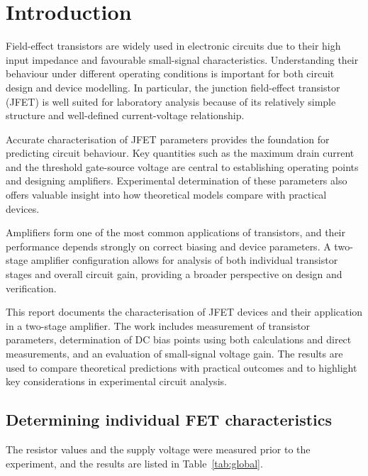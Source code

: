 \documentclass[conference]{IEEEtran}
\begin{document}
\section{Introduction}

Field-effect transistors are widely used in electronic circuits due to their high input impedance and favourable small-signal characteristics.  
Understanding their behaviour under different operating conditions is important for both circuit design and device modelling.  
In particular, the junction field-effect transistor (JFET) is well suited for laboratory analysis because of its relatively simple structure and well-defined current-voltage relationship.  

Accurate characterisation of JFET parameters provides the foundation for predicting circuit behaviour.  
Key quantities such as the maximum drain current and the threshold gate-source voltage are central to establishing operating points and designing amplifiers.  
Experimental determination of these parameters also offers valuable insight into how theoretical models compare with practical devices.  

Amplifiers form one of the most common applications of transistors, and their performance depends strongly on correct biasing and device parameters.  
A two-stage amplifier configuration allows for analysis of both individual transistor stages and overall circuit gain, providing a broader perspective on design and verification.  

This report documents the characterisation of JFET devices and their application in a two-stage amplifier.  
The work includes measurement of transistor parameters, determination of DC bias points using both calculations and direct measurements, and an evaluation of small-signal voltage gain.  
The results are used to compare theoretical predictions with practical outcomes and to highlight key considerations in experimental circuit analysis.   


\subsection{Determining individual FET characteristics}

The resistor values and the supply voltage were measured prior to the experiment, and the results are listed in Table~\ref{tab:global}.  
\end{document}
